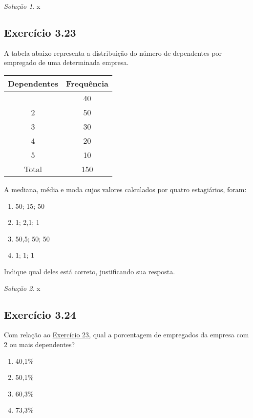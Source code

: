 \documentclass[
]{latex/krantz}
\providecommand{\tightlist}{%
  \setlength{\itemsep}{0pt}\setlength{\parskip}{0pt}}
\theoremstyle{definition}
\theoremstyle{definition}
\theoremstyle{definition}
\theoremstyle{definition}
\theoremstyle{remark}
\newtheorem*{solution}{Solução}
\begin{document}
\begin{solution}
x
\end{solution}

\hypertarget{exr3-23}{%
\subsection*{Exercício 3.23}\label{exr3-23}}

A tabela abaixo representa a distribuição do número de dependentes por empregado de uma determinada empresa.

\begin{longtable}[]{@{}cc@{}}
\toprule\noalign{}
Dependentes & Frequência \\
\midrule\noalign{}
\endhead
\bottomrule\noalign{}
\endlastfoot
1 & 40 \\
2 & 50 \\
3 & 30 \\
4 & 20 \\
5 & 10 \\
Total & 150 \\
\end{longtable}

A mediana, média e moda cujos valores calculados por quatro estagiários, foram:

\begin{enumerate}
\def\labelenumi{\alph{enumi})}
\tightlist
\item
  50; 15; 50
\item
  1; 2,1; 1
\item
  50,5; 50; 50
\item
  1; 1; 1
\end{enumerate}

Indique qual deles está correto, justificando sua resposta.

\begin{solution}
x
\end{solution}

\hypertarget{exr3-24}{%
\subsection*{Exercício 3.24}\label{exr3-24}}

Com relação ao \protect\hyperlink{exr3-23}{Exercício 23}, qual a porcentagem de empregados da empresa com 2 ou mais dependentes?

\begin{enumerate}
\def\labelenumi{\alph{enumi})}
\tightlist
\item
  40,1\%
\item
  50,1\%
\item
  60,3\%
\item
  73,3\%
\end{enumerate}
\end{document}
